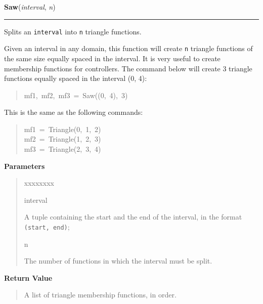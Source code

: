 \hspace{.8\funcindent}\begin{boxedminipage}{\funcwidth}

    \raggedright \textbf{Saw}(\textit{interval}, \textit{n})

    \vspace{-1.5ex}

    \rule{\textwidth}{0.5\fboxrule}
\setlength{\parskip}{2ex}

Splits an \texttt{interval} into \texttt{n} triangle functions.

Given an interval in any domain, this function will create \texttt{n} triangle
functions of the same size equally spaced in the interval. It is very
useful to create membership functions for controllers. The command below
will create 3 triangle functions equally spaced in the interval (0, 4):
%
\begin{quote}{\ttfamily \raggedright \noindent
mf1,~mf2,~mf3~=~Saw((0,~4),~3)
}
\end{quote}

This is the same as the following commands:
%
\begin{quote}{\ttfamily \raggedright \noindent
mf1~=~Triangle(0,~1,~2)\\
mf2~=~Triangle(1,~2,~3)\\
mf3~=~Triangle(2,~3,~4)
}
\end{quote}
\setlength{\parskip}{1ex}
      \textbf{Parameters}
      \vspace{-1ex}

      \begin{quote}
        \begin{Ventry}{xxxxxxxx}

          \item[interval]


A tuple containing the start and the end of the interval, in the format
\texttt{(start, end)};
          \item[n]


The number of functions in which the interval must be split.
        \end{Ventry}

      \end{quote}

      \textbf{Return Value}
    \vspace{-1ex}

      \begin{quote}

A list of triangle membership functions, in order.
      \end{quote}

    \end{boxedminipage}

